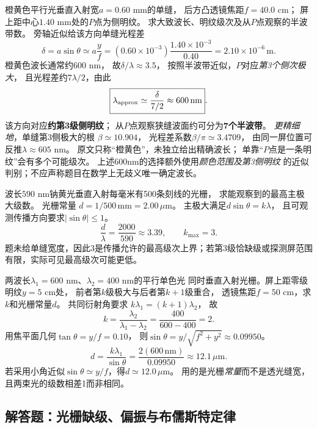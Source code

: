 \problemtext 橙黄色平行光垂直入射宽$a=0.60$ mm的单缝，
后方凸透镜焦距$f=40.0$ cm；
屏上距中心$1.40$ mm处的$P$点为侧明纹。
求大致波长、明纹级次及从$P$点观察的半波带数。
\workings
旁轴近似给该方向单缝光程差
\[
\delta=a\sin\theta\simeq a\frac yf
=(0.60\times10^{-3})\frac{1.40\times10^{-3}}{0.40}
=2.10\times10^{-6}\,\mathrm m.
\]
橙黄色波长通常约$600$ nm，
故$\delta/\lambda\approx3.5$，
按照半波带近似，$P$对应\emph{第3个侧次极大}，
且光程差约$7\lambda/2$，由此
\[
\boxed{\lambda_{\rm approx}\simeq
\frac{\delta}{7/2}\approx600\,\mathrm{nm}}.
\]
该方向对应\textbf{约第3级侧明纹}；
从$P$点观察狭缝波面约可分为\textbf{7个半波带}。
\emph{更精细地}，单缝第3侧极大的根
$\beta\simeq10.904$，
光程差系数$\beta/\pi\simeq3.4709$，
由同一屏位置可反推$\lambda\approx605$ nm。
\crosscheck 原文只称“橙黄色”，未独立给出精确波长；
单靠“$P$点是一条明纹”会有多个可能级次。
上述600nm的选择额外使用\emph{颜色范围及第3侧明纹}
的近似判别；不应声称题目在数学上无歧义唯一确定波长。

\problemtext 波长$590$ nm钠黄光垂直入射每毫米有500条刻线的光栅，
求能观察到的最高主极大级数。
\workings
光栅常量
$d=1/500\,\mathrm{mm}=2.00\,\mu\mathrm m$。
主极大满足$d\sin\theta=k\lambda$，
且可观测传播方向要求$|\sin\theta|\le1$。
\[
\frac d\lambda=\frac{2000}{590}\approx3.39,
\qquad\boxed{k_{\max}=3}.
\]
\crosscheck 题未给单缝宽度，因此3是传播允许的最高级次上界；若第3级恰缺级或探测屏范围有限，实际可见最高级次可能更低。

\problemtext 两波长$\lambda_1=600$ nm、$\lambda_2=400$ nm的平行单色光
同时垂直入射光栅。屏上距零级明纹$y=5$ cm处，
前者第$k$级极大与后者第$k+1$级重合，
透镜焦距$f=50$ cm，求$k$和光栅常量$d$。
\workings
共同衍射角要求
$k\lambda_1=(k+1)\lambda_2$，
故
\[
\boxed{k=\frac{\lambda_2}{\lambda_1-\lambda_2}
=\frac{400}{600-400}=2}.
\]
用焦平面几何$\tan\theta=y/f=0.10$，
则$\sin\theta=y/\sqrt{f^2+y^2}\approx0.09950$。
\[
\boxed{d=\frac{k\lambda_1}{\sin\theta}
=\frac{2(600\,\mathrm{nm})}{0.09950}
\approx12.1\,\mu\mathrm m}.
\]
若采用小角近似$\sin\theta\simeq y/f$，得$d\simeq12.0\,\mu$m。
\crosscheck 用的是光栅\emph{常量}而不是透光缝宽，
且两束光的级数相差1而非相同。

\subsection{解答题：光栅缺级、偏振与布儒斯特定律}

